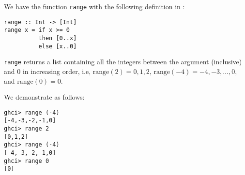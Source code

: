 
We have the function \verb|range| with the following definition in 
:
\begin{verbatim}
range :: Int -> [Int]
range x = if x >= 0
          then [0..x]
          else [x..0]
\end{verbatim}
\verb|range| returns a list containing all the integers between the argument 
(inclusive) and 0 in increasing order, i.e, $\text{range}(2) = 0, 1, 2$, 
$\text{range}(-4) = -4, -3, \ldots, 0$, and $\text{range}(0) = 0$.\par
\qquad We demonstrate as follows:
\begin{verbatim}
ghci> range (-4)
[-4,-3,-2,-1,0]
ghci> range 2
[0,1,2]
ghci> range (-4)
[-4,-3,-2,-1,0]
ghci> range 0
[0]
\end{verbatim}
